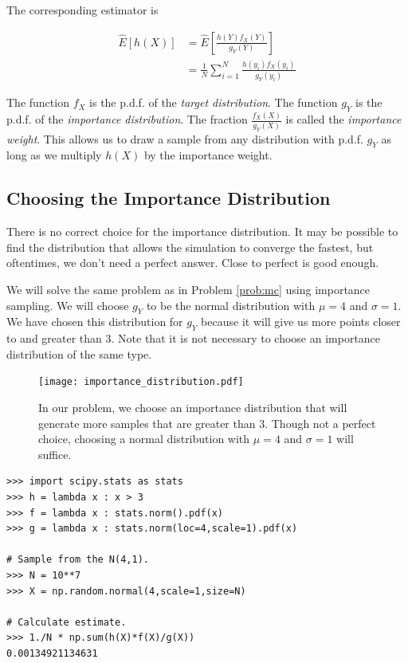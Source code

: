 The corresponding estimator is

\begin{equation}\label{eq:imp_estimator}
\begin{split}
\widehat{E}[h(X)] & = \widehat{E}\left [ \frac{h(Y)f_X(Y)}{g_Y(Y)}\right ] \\
& = \frac{1}{N}\sum_{i = 1}^{N}\frac{h(y_i)f_X(y_i)}{g_Y(y_i)}
\end{split}
\end{equation}

The function $f_X$ is the p.d.f. of the \emph{target distribution}. The function $g_Y$ is the p.d.f. of the \emph{importance distribution}. The fraction $\frac{f_X(X)}{g_Y(X)}$ is called the \emph{importance weight}. This allows us to draw a sample from any distribution with p.d.f. $g_Y$ as long as we multiply $h(X)$ by the importance weight. 

\subsection*{Choosing the Importance Distribution}
There is no correct choice for the importance distribution. It may be possible to find the distribution that allows the simulation to converge the fastest, but oftentimes, we don't need a perfect answer. Close to perfect is good enough.

We will solve the same problem as in Problem \ref{prob:mc} using importance sampling. We will choose $g_Y$ to be the normal distribution with $\mu = 4$ and $\sigma = 1$. 
We have chosen this distribution for $g_Y$ because it will give us more points closer to and greater than 3. Note that it is not necessary to choose an importance distribution of the same type.

\begin{figure}[H]
\texttt{[image: importance\_distribution.pdf]}
\caption{In our problem, we choose an importance distribution that will generate more samples that are greater than 3. Though not a perfect choice, choosing a normal distribution with $\mu = 4$ and $\sigma = 1$ will suffice.}
\label{fig:importance}
\end{figure}

\begin{lstlisting}
>>> import scipy.stats as stats
>>> h = lambda x : x > 3
>>> f = lambda x : stats.norm().pdf(x)
>>> g = lambda x : stats.norm(loc=4,scale=1).pdf(x)

# Sample from the N(4,1).
>>> N = 10**7
>>> X = np.random.normal(4,scale=1,size=N)

# Calculate estimate.
>>> 1./N * np.sum(h(X)*f(X)/g(X))
0.00134921134631
\end{lstlisting}

